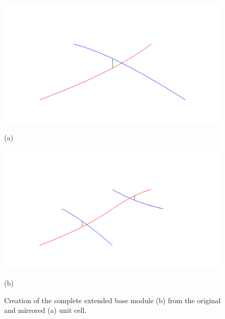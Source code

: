 \begin{figure} [ht]
   \centering
   \begin{makeimage}
   \end{makeimage}
   \begin{latexonly}
	\hspace{0.1cm}
	\begin{minipage} [c] [] [c]{5.5cm} 
	\includegraphics [width =\textwidth] {images/WireStentDemot2Step10}
	\begin{center}
	\vspace{-3ex}
	(a)
	\vspace{1ex}
	\end{center}
\end{minipage}
\hspace{0.3cm}
\begin{minipage} [c] [] [c] {5.5cm}
	\includegraphics [width =\textwidth] {images/WireStentDemot2Step11}
	\begin{center}
	\vspace{-3ex}
	(b)
	\vspace{1ex}
	\end{center}
\end{minipage}
\hspace{0.3cm}
   \end{latexonly}
   \begin{htmlonly}
   \end{htmlonly} 
	\caption {Creation of the complete extended base module (b) from the original and mirrored (a) unit cell.} 
	\label{BASE}
\end{figure}

